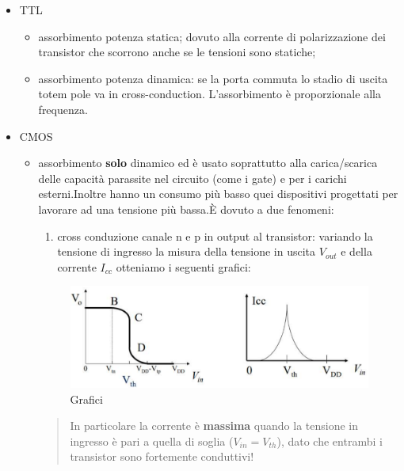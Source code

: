 \documentclass[
]{book}
\providecommand{\tightlist}{%
  \setlength{\itemsep}{0pt}\setlength{\parskip}{0pt}}
\begin{document}
\begin{itemize}
\tightlist
\item
  TTL

  \begin{itemize}
  \tightlist
  \item
    assorbimento potenza statica; dovuto alla corrente di polarizzazione
    dei transistor che scorrono anche se le tensioni sono statiche;
  \item
    assorbimento potenza dinamica: se la porta commuta lo stadio di
    uscita totem pole va in cross-conduction. L'assorbimento è
    proporzionale alla frequenza.
  \end{itemize}
\item
  CMOS

  \begin{itemize}
  \tightlist
  \item
    assorbimento \textbf{solo} dinamico ed è usato soprattutto alla
    carica/scarica delle capacità parassite nel circuito (come i gate) e
    per i carichi esterni.\newline Inoltre hanno un consumo più basso
    quei dispositivi progettati per lavorare ad una tensione più
    bassa.\newline È dovuto a due fenomeni:

    \begin{enumerate}
    \def\labelenumi{\Alph{enumi})}
    \tightlist
    \item
      cross conduzione canale n e p in output al transistor: variando la
      tensione di ingresso la misura della tensione in uscita
      \(V_{out}\) e della corrente \(I_{cc}\) otteniamo i seguenti
      grafici:
    \end{enumerate}

    \begin{figure}
    \centering
    \includegraphics[width=0.6\linewidth,height=\textheight,keepaspectratio]{assets/imgs/grafici_invertitore.png}
    \caption{Grafici}
    \end{figure}

    \begin{quote}
    In particolare la corrente è \textbf{massima} quando la tensione in
    ingresso è pari a quella di soglia (\(V_{in}=V_{th}\)), dato che
    entrambi i transistor sono fortemente conduttivi!
    \end{quote}


\end{itemize}
\end{itemize}
\end{document}
